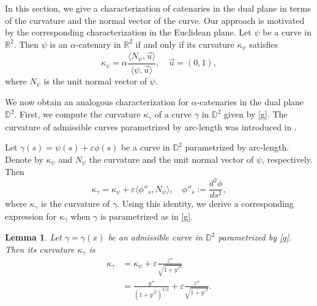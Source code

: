 \documentclass[a4paper,12pt]{amsart}
\newtheorem{lemma}[theorem]{Lemma}
\theoremstyle{definition}
\def\r{\mathbb R}
\def\d{\mathsf d}
\def\d{\mathbb D}
\begin{document}
In this section, we give a characterization of catenaries in the dual plane in terms of the curvature and the normal vector of the curve. Our approach is motivated by the corresponding characterization in the Euclidean plane. Let $\psi$ be a curve in $\r^2$. Then $\psi$ is an $\alpha$-catenary in $\r^2$ if and only if its curvature $\kappa_\psi$ satisfies
\begin{equation}
\kappa_\psi=\alpha \frac{\langle N_\psi,\vec{u} \rangle}{\langle \psi,\vec{u}\rangle}, \quad \vec{u}=(0,1),\label{cpsi}
\end{equation}
where $N_\psi$ is the unit normal vector   of   $\psi$. 

We now obtain an analogous characterization for  $\alpha$-catenaries in the dual plane $\d^2$. First, we compute the curvature $\kappa_\gamma$ of a curve $\gamma$ in $\d^2$ given by \eqref{g}. The curvature of admissible curves parametrized by arc-length was introduced in  \cite{lo}.
 
Let $\gamma(s)=\psi(s)+\varepsilon\phi(s)$ be a curve in $\d^2$ parametrized by arc-length. Denote by $\kappa_\psi$ and $N_\psi$ the curvature and the unit normal vector of $\psi$, respectively. Then
\begin{equation}\label{cu0}
\kappa_\gamma=\kappa_\psi+\varepsilon\langle\phi''_s,N_\psi\rangle, \quad \phi''_s:=\frac{d^2\phi}{ds^2},
\end{equation}
where $\kappa_\gamma$ is the curvature of $\gamma$. Using this identity, we derive a corresponding expression for $\kappa_\gamma$ when $\gamma$ is parametrized as in \eqref{g}.

\begin{lemma} Let $\gamma=\gamma(x)$ be an admissible curve in $\d^2$ parametrized by \eqref{g}. Then its curvature $\kappa_\gamma$ is 
\begin{equation}\label{cu}
\begin{split}
\kappa_\gamma&=\kappa_\psi + \varepsilon \frac{z''}{\sqrt{1+y'^2}}\\
&=\frac{y''}{(1+y'^2)^{3/2}}+\varepsilon \frac{z''}{\sqrt{1+y'^2}}.
\end{split}
\end{equation}
\end{lemma}
\end{document}
